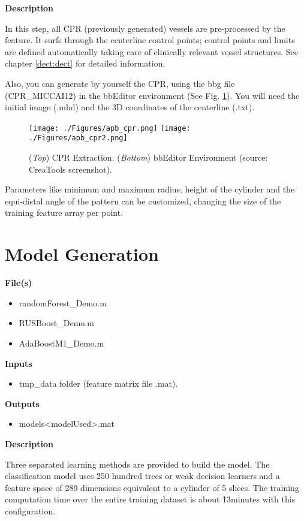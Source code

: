 \textbf{Description}

In this step, all CPR (previously generated) vessels are pre-processed by the feature. It surfs through the centerline control points; control points and limits are defined automatically taking care of clinically relevant vessel structures. See chapter \ref{dect:dect} for detailed information.

Also, you can generate by yourself the CPR, using the bbg file (CPR\_MICCAI12) in the bbEditor environment (See Fig. \ref{fig:cpr}). You will need the initial image (.mhd) and the 3D coordinates of the centerline (.txt).

\begin{figure}[ht]
	\centering
		\texttt{[image: ./Figures/apb\_cpr.png]}
		\texttt{[image: ./Figures/apb\_cpr2.png]}
	\caption[CPR Extraction]{(\textit{Top}) CPR Extraction. (\textit{Bottom}) bbEditor Environment (source: CreaTools screenshot).}
	\label{fig:cpr}
\end{figure}

Parameters like minimum and maximum radius; height of the cylinder and the equi-distal angle of the pattern can be customized, changing the size of the training feature array per point. 

\section{Model Generation}

\textbf{File(s)}
\begin{itemize}
\item randomForest\_Demo.m
\item RUSBoost\_Demo.m
\item AdaBoostM1\_Demo.m
\end{itemize}

\textbf{Inputs}
\begin{itemize}
\item tmp\_data folder (feature matrix file \*.mat).
\end{itemize}

\textbf{Outputs}
\begin{itemize}
\item models\/<modelUsed>.mat
\end{itemize}

\textbf{Description}

Three separated learning methods are provided to build the model.
The classification model uses 250 hundred trees or weak decision learners and a feature space of 289 dimensions equivalent to a cylinder of 5 slices. The training computation time over the entire training dataset is about \~ 13minutes with this configuration.

